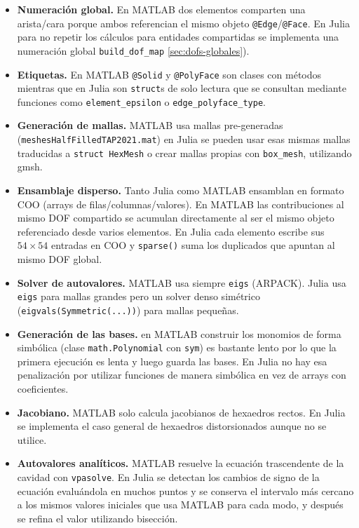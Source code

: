 \documentclass[12pt]{report} %
\begin{document}
\begin{itemize}
	\item \textbf{Numeración global.} En MATLAB dos elementos comparten una arista/cara porque ambos referencian el mismo objeto \texttt{@Edge}/\texttt{@Face}. En Julia para no repetir los cálculos para entidades compartidas se implementa una numeración global \texttt{build\_dof\_map} \autoref{sec:dofs-globales}).
	
	\item \textbf{Etiquetas.} En MATLAB \texttt{@Solid} y \texttt{@PolyFace} son clases con métodos mientras que en Julia son \texttt{struct}s de solo lectura que se consultan mediante funciones como \texttt{element\_epsilon} o \texttt{edge\_polyface\_type}.

	\item \textbf{Generación de mallas.} MATLAB usa mallas pre-generadas (\texttt{meshesHalfFilledTAP2021.mat}) en Julia se pueden usar esas mismas mallas traducidas a \texttt{struct HexMesh} o crear mallas propias con \texttt{box\_mesh}, utilizando gmsh.
	
	\item \textbf{Ensamblaje disperso.} Tanto Julia como MATLAB ensamblan en formato COO (arrays de filas/columnas/valores). En MATLAB las contribuciones al mismo DOF compartido se acumulan directamente al ser el mismo objeto referenciado desde varios elementos. En Julia cada elemento escribe sus $54\times54$ entradas en COO y \texttt{sparse()} suma los duplicados que apuntan al mismo DOF global.
	
	\item \textbf{Solver de autovalores.} MATLAB usa siempre \texttt{eigs} (ARPACK). Julia usa \texttt{eigs} para mallas grandes pero un solver denso simétrico (\texttt{eigvals(Symmetric(...))}) para mallas pequeñas.
	
	\item \textbf{Generación de las bases.} en MATLAB construir los monomios de forma simbólica (clase \texttt{math.Polynomial} con \texttt{sym}) es bastante lento  por lo que la primera ejecución es lenta y luego guarda las bases. En Julia no hay esa penalización por utilizar funciones de manera simbólica en vez de arrays con coeficientes.
	
	\item \textbf{Jacobiano.} MATLAB solo calcula jacobianos de hexaedros rectos. En Julia se implementa el caso general de hexaedros distorsionados aunque no se utilice.
	
	\item \textbf{Autovalores analíticos.} MATLAB resuelve la ecuación trascendente de la cavidad con \texttt{vpasolve}. En Julia se detectan los cambios de signo de la ecuación evaluándola en muchos puntos y se conserva el intervalo más cercano a los mismos valores iniciales que usa MATLAB para cada modo, y después se refina el valor utilizando bisección.
	
\end{itemize}
\end{document}
